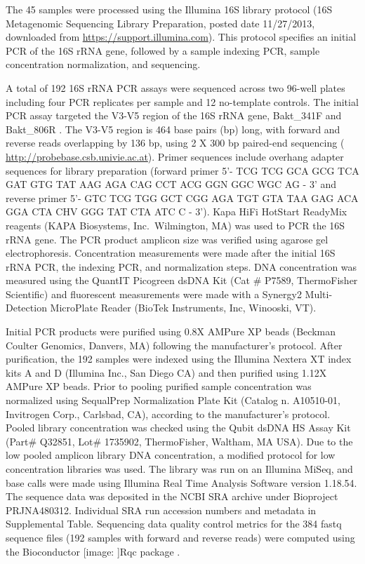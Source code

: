 \documentclass[linenumbers]{bmcart}
\def\texttt{[image: ]}
\begin{document}
The 45 samples were processed using the Illumina 16S library protocol
(16S Metagenomic Sequencing Library Preparation, posted date 11/27/2013,
downloaded from \url{https://support.illumina.com}). This protocol
specifies an initial PCR of the 16S rRNA gene, followed by a sample indexing
PCR, sample concentration normalization, and sequencing.

A total of 192 16S rRNA PCR assays were sequenced across two 96-well plates including four PCR replicates
per sample and 12 no-template controls. The initial
PCR assay targeted the V3-V5 region of the 16S rRNA gene, Bakt\_341F and
Bakt\_806R \cite{klindworth2012evaluation}. The V3-V5 region is 464
base pairs (bp) long, with forward and reverse reads overlapping by 136
bp, using 2 X 300 bp paired-end sequencing \cite{yang2016sensitivity} (
\url{http://probebase.csb.univie.ac.at}). Primer sequences include
overhang adapter sequences for library preparation (forward primer 5'-
TCG TCG GCA GCG TCA GAT GTG TAT AAG AGA CAG CCT ACG GGN GGC WGC AG - 3'
and reverse primer 5'- GTC TCG TGG GCT CGG AGA TGT GTA TAA GAG ACA GGA
CTA CHV GGG TAT CTA ATC C - 3'). Kapa HiFi HotStart
ReadyMix reagents (KAPA Biosystems, Inc.~Wilmington, MA) was used to PCR the 16S rRNA gene. The PCR product amplicon size
was verified using agarose gel electrophoresis.
Concentration measurements were made after the initial 16S rRNA PCR, the
indexing PCR, and normalization steps. DNA concentration was measured
using the QuantIT Picogreen dsDNA Kit (Cat \# P7589, ThermoFisher
Scientific) and fluorescent measurements were made with a Synergy2
Multi-Detection MicroPlate Reader (BioTek Instruments, Inc, Winooski,
VT).


Initial PCR products were purified using 0.8X AMPure XP beads (Beckman
Coulter Genomics, Danvers, MA) following the manufacturer's protocol.
After purification, the 192 samples were indexed using the Illumina
Nextera XT index kits A and D (Illumina Inc., San Diego CA) and then
purified using 1.12X AMPure XP beads. Prior to pooling purified sample
concentration was normalized using SequalPrep Normalization Plate Kit
(Catalog n. A10510-01, Invitrogen Corp., Carlsbad, CA), according to the
manufacturer's protocol. Pooled library concentration was checked using
the Qubit dsDNA HS Assay Kit (Part\# Q32851, Lot\# 1735902,
ThermoFisher, Waltham, MA USA). Due to the low pooled amplicon library
DNA concentration, a modified protocol for low concentration libraries
was used. The library was run on an Illumina MiSeq, and base calls were
made using Illumina Real Time Analysis Software version 1.18.54.
The sequence data was deposited in the NCBI SRA archive under Bioproject
PRJNA480312. Individual SRA run accession numbers and metadata in Supplemental Table.
Sequencing data quality control metrics for the 384 fastq sequence files
(192 samples with forward and reverse reads) were computed using the
Bioconductor \texttt{Rqc} package \cite{Rqc, Bioconductor}.
\end{document}
